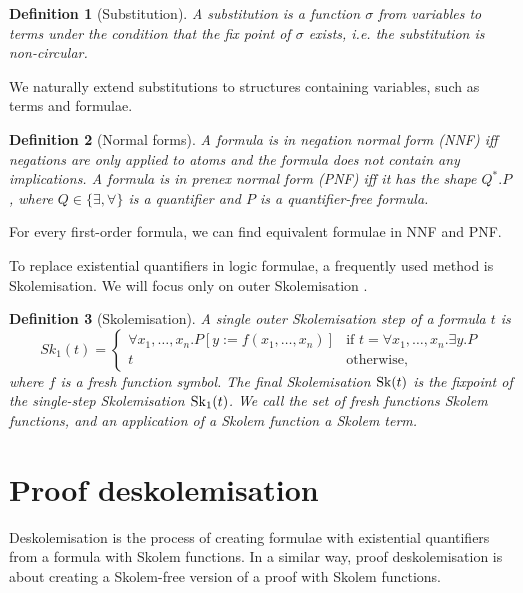 \documentclass[]{article}
\newtheorem{definition}{Definition}
\begin{document}
\begin{definition}[Substitution]
A substitution is a function $\sigma$ from variables to terms
under the condition that the fix point of $\sigma$ exists, i.e.
the substitution is non-circular.
\end{definition}

We naturally extend substitutions to structures containing variables,
such as terms and formulae.

\begin{definition}[Normal forms]
A formula is in negation normal form (NNF) iff negations are
only applied to atoms and the formula does not contain any implications.
A formula is in prenex normal form (PNF) iff it has the shape $Q^\ast. P$,
where $Q \in \{ \exists, \forall \}$ is a quantifier and
$P$ is a quantifier-free formula.
\end{definition}

For every first-order formula, we can find equivalent formulae in NNF
and PNF.

To replace existential quantifiers in logic formulae, a frequently used
method is Skolemisation. We will focus only on outer Skolemisation
\citep{nonnengart2001-cnf}.

\begin{definition}[Skolemisation]
A single outer Skolemisation step of a formula $t$ is
$$Sk_1(t) = \begin{cases}
\forall x_1, \dots, x_n. P[y := f(x_1, \dots, x_n)] & \text{if } t = \forall x_1, \dots, x_n. \exists y. P \\
t & \text{otherwise,}
\end{cases}
$$
where $f$ is a fresh function symbol.
The final Skolemisation $\operatorname{Sk}(t)$ is the fixpoint of
the single-step Skolemisation $\operatorname{Sk}_1(t)$. We call the set of
fresh functions Skolem functions, and an application of a
Skolem function a Skolem term.
\end{definition}

\section{Proof deskolemisation}\label{proof-deskolemisation}

Deskolemisation is the process of creating formulae with existential
quantifiers from a formula with Skolem functions. In a similar way,
proof deskolemisation is about creating a Skolem-free version of a proof
with Skolem functions.
\end{document}
